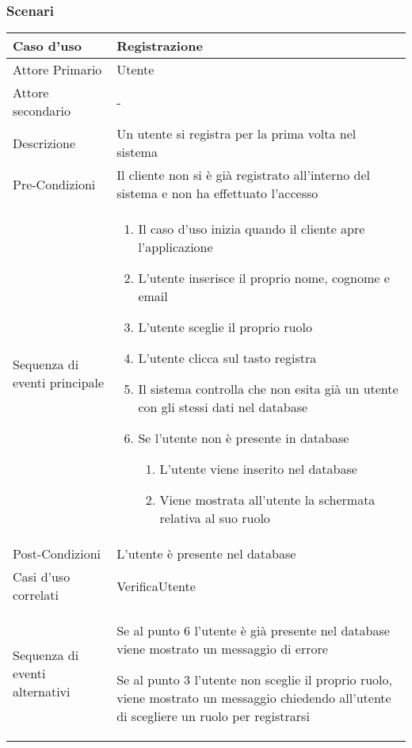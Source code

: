 
\subsubsection{Scenari}
\label{sec:scenari}
\begin{tabular}{|p{3cm}|p{7cm}|}
  \hline
  \rowcolor{Orchid}
  Caso d'uso & Registrazione \\
  \hline
  Attore Primario & Utente\\
  \hline
  Attore secondario & - \\
  \hline
  Descrizione & Un utente si registra per la prima volta nel sistema\\
  \hline
  Pre-Condizioni & Il cliente non si è già registrato all'interno del sistema e non ha effettuato l'accesso\\
  \hline
  Sequenza di eventi principale &
                                  \begin{enumerate}
                                  \item Il caso d'uso inizia quando il cliente apre l'applicazione
                                  \item L'utente inserisce il proprio nome, cognome e email
                                  \item L'utente sceglie il proprio ruolo
                                  \item L'utente clicca sul tasto registra
                                  \item Il sistema controlla che non esita già un utente con gli stessi dati nel database
                                  \item Se l'utente non è presente in database
                                    \begin{enumerate}
                                    \item L'utente viene inserito nel database
                                    \item Viene mostrata all'utente la schermata relativa al suo ruolo
                                    \end{enumerate}
                                    \end{enumerate}
  \\
  \hline
  Post-Condizioni & L'utente è presente nel database\\
  \hline
  Casi d'uso correlati & VerificaUtente\\
  \hline
  Sequenza di eventi alternativi & Se al punto 6 l'utente è già presente nel database viene mostrato un messaggio di errore
                                   
                                   Se al punto 3 l'utente non sceglie il proprio ruolo, viene mostrato un messaggio chiedendo all'utente di scegliere un ruolo per registrarsi\\
  \hline
\end{tabular}

